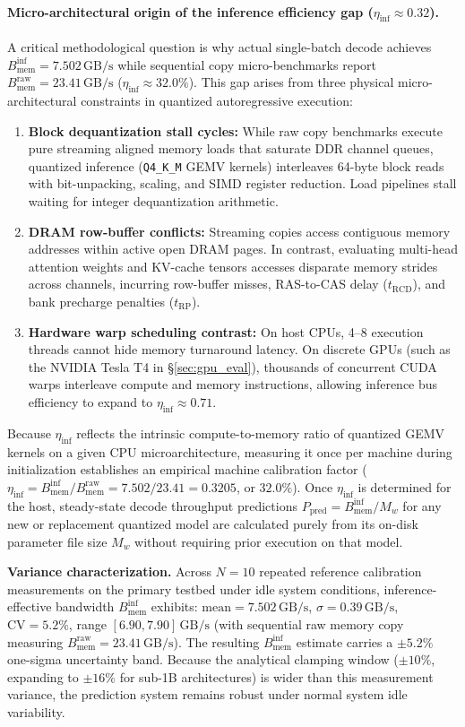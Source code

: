 \documentclass[11pt,a4paper]{article}
\newcommand{\Binf}{B_{\mathrm{mem}}^{\mathrm{inf}}}
\newcommand{\Braw}{B_{\mathrm{mem}}^{\mathrm{raw}}}
\newcommand{\Ppred}{P_{\mathrm{pred}}}
\newcommand{\Mw}{M_w}
\newcommand{\GBs}{\,\mathrm{GB/s}}
\newcommand{\code}[1]{\texttt{#1}}
\begin{document}
\paragraph{Micro-architectural origin of the inference efficiency gap ($\eta_{\mathrm{inf}} \approx 0.32$).}
A critical methodological question is why actual single-batch decode achieves $\Binf = 7.502\GBs$ while sequential copy micro-benchmarks report $\Braw = 23.41\GBs$ ($\eta_{\mathrm{inf}} \approx 32.0\%$). This gap arises from three physical micro-architectural constraints in quantized autoregressive execution:
\begin{enumerate}[leftmargin=*]
  \item \textbf{Block dequantization stall cycles:} While raw copy benchmarks execute pure streaming aligned memory loads that saturate DDR channel queues, quantized inference (\code{Q4\_K\_M} GEMV kernels) interleaves 64-byte block reads with bit-unpacking, scaling, and SIMD register reduction. Load pipelines stall waiting for integer dequantization arithmetic.
  \item \textbf{DRAM row-buffer conflicts:} Streaming copies access contiguous memory addresses within active open DRAM pages. In contrast, evaluating multi-head attention weights and KV-cache tensors accesses disparate memory strides across channels, incurring row-buffer misses, RAS-to-CAS delay ($t_{\mathrm{RCD}}$), and bank precharge penalties ($t_{\mathrm{RP}}$).
  \item \textbf{Hardware warp scheduling contrast:} On host CPUs, 4--8 execution threads cannot hide memory turnaround latency. On discrete GPUs (such as the NVIDIA Tesla T4 in \S\ref{sec:gpu_eval}), thousands of concurrent CUDA warps interleave compute and memory instructions, allowing inference bus efficiency to expand to $\eta_{\mathrm{inf}} \approx 0.71$.
\end{enumerate}
Because $\eta_{\mathrm{inf}}$ reflects the intrinsic compute-to-memory ratio of quantized GEMV kernels on a given CPU microarchitecture, measuring it once per machine during initialization establishes an empirical machine calibration factor ($\eta_{\mathrm{inf}} = \Binf / \Braw = 7.502 / 23.41 = 0.3205$, or $32.0\%$). Once $\eta_{\mathrm{inf}}$ is determined for the host, steady-state decode throughput predictions $\Ppred = \Binf / \Mw$ for any new or replacement quantized model are calculated purely from its on-disk parameter file size $\Mw$ without requiring prior execution on that model.

\noindent\textbf{Variance characterization.} Across $N=10$ repeated reference calibration measurements on the primary testbed under idle system conditions, inference-effective bandwidth $\Binf$ exhibits: $\mathrm{mean} = 7.502\GBs$, $\sigma = 0.39\GBs$, $\mathrm{CV} = 5.2\%$, range $[6.90, 7.90]\GBs$ (with sequential raw memory copy measuring $\Braw = 23.41\GBs$). The resulting $\Binf$ estimate carries a $\pm 5.2\%$ one-sigma uncertainty band. Because the analytical clamping window ($\pm 10\%$, expanding to $\pm 16\%$ for sub-1B architectures) is wider than this measurement variance, the prediction system remains robust under normal system idle variability.
\end{document}
